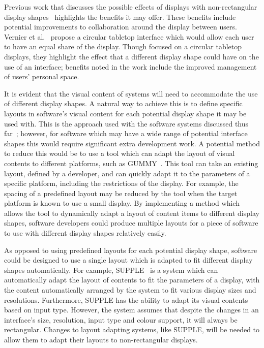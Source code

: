 \documentclass[review,5p,times,twocolumn]{elsarticle}
\begin{document}
Previous work that discusses the possible effects of displays with non-rectangular display shapes~\cite{Vernier2002} highlights the benefits it may offer.
These benefits include potential improvements to collaboration around the display between users.
Vernier et al.~\cite{Vernier2002} propose a circular tabletop interface which would allow each user to have an equal share of the display.
Though focused on a circular tabletop displays, they highlight the effect that a different display shape could have on the use of an interface; benefits noted in the work include the improved management of users' personal space.

It is evident that the visual content of systems will need to accommodate the use of different display shapes.
A natural way to achieve this is to define specific layouts in software's visual content for each potential display shape it may be used with.
This is the approach used with the software systems discussed thus far~\cite{Hansen2009,Shen2004}; however, for software which may have a wide range of potential interface shapes this would require significant extra development work.
A potential method to reduce this would be to use a tool which can adapt the layout of visual contents to different platforms, such as GUMMY~\cite{Meskens2008}.
This tool can take an existing layout, defined by a developer, and can quickly adapt it to the parameters of a specific platform, including the restrictions of the display.
For example, the spacing of a predefined layout may be reduced by the tool when the target platform is known to use a small display.
By implementing a method which allows the tool to dynamically adapt a layout of content items to different display shapes, software developers could produce multiple layouts for a piece of software to use with different display shapes relatively easily.

As opposed to using predefined layouts for each potential display shape, software could be designed to use a single layout which is adapted to fit different display shapes automatically.
For example, SUPPLE~\cite{Gajos2004} is a system which can
automatically adapt the layout of contents to fit the parameters of a display, with the content automatically arranged by the system to fit various display sizes and resolutions.
Furthermore, SUPPLE has the ability to adapt its visual contents based on input type.
However, the system assumes that despite the changes in an interface's size, resolution, input type and colour support, it will always be rectangular.
Changes to layout adapting systems, like SUPPLE, will be needed to allow them to adapt their layouts to non-rectangular displays.
\end{document}
